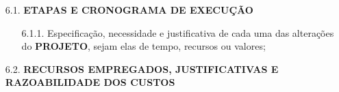 {\begin{lmarginbox}
\begin{enumerate}[leftmargin=1cm, font=\bfseries]
\begin{enumerate}[font=\bfseries]
\begin{enumerate}[font=\bfseries]
                    \end{enumerate}

            \end{enumerate}

        \item[6.1.]	\textbf{ETAPAS E CRONOGRAMA DE EXECUÇÃO}
            \begin{enumerate}[font=\bfseries]
                \item[6.1.1.] Especificação, necessidade e justificativa de cada uma das alterações do \textbf{PROJETO}, sejam elas de tempo, recursos ou valores;

            \end{enumerate}

        \item[6.2.]	\textbf{RECURSOS EMPREGADOS, JUSTIFICATIVAS E RAZOABILIDADE DOS CUSTOS}
            \begin{enumerate}[font=\bfseries]


\end{enumerate}
\end{enumerate}
\end{lmarginbox}}
